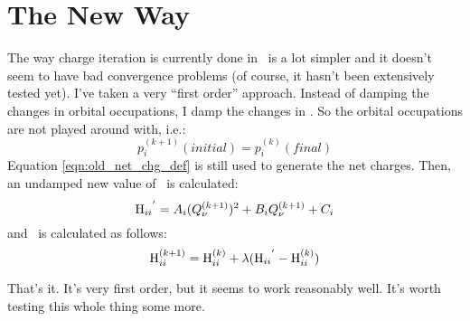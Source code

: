 \section{The New Way}

The way charge iteration is currently done in \calcprog\ is a lot
simpler and it doesn't seem to have bad convergence problems (of
course, it hasn't been extensively tested yet).  I've
taken a very ``first order'' approach.  Instead of damping the changes
in orbital occupations, I damp the changes in \Hii.  
So the orbital occupations are not played around with, i.e.:
\begin{equation}
p_i^{(k+1)}(initial) = p_i^{(k)}(final)
\end{equation}
Equation \ref{eqn:old_net_chg_def} is still used to generate the net
charges. 
Then, an undamped new value of \Hii\ is calculated:
\begin{equation}
\mbox {H$_{ii}$}^{'} = A_i (Q_{\nu}^{(k+1)})^2 + B_i Q_{\nu}^{(k+1)} + C_i  
\label{eqn:Hiinew_def}
\end{equation}
and \Hiip\ is
calculated as follows:
\begin{equation}
\mbox {H$_{ii}^{(k+1)}$} = \mbox {H$_{ii}^{(k)}$} + \lambda (\mbox {H$_{ii}$}^{'} - \mbox {H$_{ii}^{(k)}$})
\end{equation}


That's it.  It's very first order, but it seems to work reasonably
well.  It's worth testing this whole thing some more.



